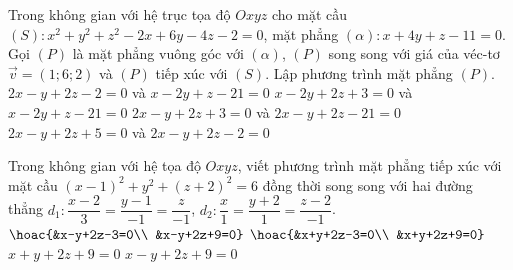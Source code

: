 \begin{ex}%
	Trong không gian với hệ trục tọa độ $Oxyz$ cho mặt cầu $(S)\colon x^2+y^2+z^2-2x+6y-4z-2=0$, mặt phẳng $(\alpha)\colon x+4y+z-11=0$. Gọi $(P)$ là mặt phẳng vuông góc với $(\alpha)$, $(P)$ song song với giá của véc-tơ $\overrightarrow{v}=(1;6;2)$ và $(P)$ tiếp xúc với $(S)$. Lập phương trình mặt phẳng $(P)$.
	\choice
	{$2x-y+2z-2=0$ và $x-2y+z-21=0$}
	{$x-2y+2z+3=0$ và $x-2y+z-21=0$}
	{\True $2x-y+2z+3=0$ và $2x-y+2z-21=0$}
	{$2x-y+2z+5=0$ và $2x-y+2z-2=0$}
\end{ex}
\begin{ex}%
	Trong không gian với hệ tọa độ $Oxyz$, viết phương trình mặt phẳng tiếp xúc với mặt cầu $(x-1)^2+y^2+(z+2)^2=6$ đồng thời song song với hai đường thẳng $d_1\colon \dfrac{x-2}{3}=\dfrac{y-1}{-1}=\dfrac{z}{-1}$, $d_2\colon \dfrac{x}{1}=\dfrac{y+2}{1}=\dfrac{z-2}{-1}$.
	\choice
	{$\hoac{&x-y+2z-3=0\\ &x-y+2z+9=0}$}
	{\True $\hoac{&x+y+2z-3=0\\ &x+y+2z+9=0}$}
	{$x+y+2z+9=0$}
	{$x-y+2z+9=0$}
\end{ex}
